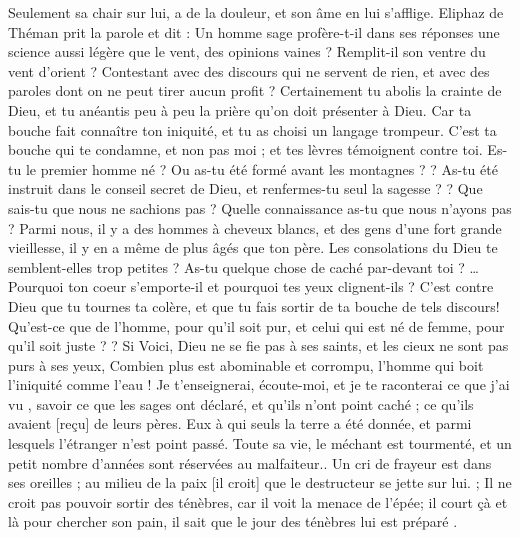 \begin{multicols}{2}
Seulement sa chair sur lui, a de la douleur, et son âme en lui s'afflige. 
\VerseOne{}Eliphaz de Théman prit la parole et dit :
Un homme sage profère-t-il dans ses réponses une science aussi légère que le vent, des opinions vaines ? Remplit-il son ventre du vent d'orient ?
Contestant avec des discours qui ne servent de rien, et avec des paroles dont on ne peut tirer aucun profit ?
Certainement tu abolis la crainte de Dieu, et tu anéantis peu à peu la prière qu'on doit présenter à Dieu. 
 Car ta bouche fait connaître ton iniquité, et tu as choisi un langage trompeur. 
C'est ta bouche qui te condamne, et non pas moi ; et tes lèvres témoignent contre toi. 
Es-tu le premier homme né ? Ou as-tu été formé avant les montagnes ?  ?
As-tu été instruit dans le conseil secret de Dieu, et renfermes-tu seul la sagesse ?  ?
Que sais-tu que nous ne sachions pas ? Quelle connaissance as-tu que nous n'ayons pas ?
Parmi nous, il y a des hommes à cheveux blancs, et des gens d'une fort grande vieillesse, il y en a même de plus âgés que ton père. 
Les consolations du Dieu te semblent-elles trop petites ? As-tu quelque chose de caché par-devant toi ? …
Pourquoi ton coeur s'emporte-il et pourquoi tes yeux clignent-ils ?
C'est contre Dieu que tu tournes ta colère, et que tu fais sortir de ta bouche de tels discours! 
Qu'est-ce que de l'homme, pour qu'il soit pur, et celui qui est né de femme, pour qu'il soit juste ?  ?
Si Voici, Dieu ne se fie pas à ses saints, et les cieux ne sont pas purs à ses yeux,
Combien plus est abominable et corrompu, l'homme qui boit l'iniquité comme l'eau !  
Je t'enseignerai, écoute-moi, et je te raconterai ce que j'ai vu ,
 savoir ce que les sages ont déclaré, et qu'ils n'ont point caché ; ce qu'ils avaient [reçu] de leurs pères.
Eux à qui seuls la terre a été donnée, et parmi lesquels l'étranger n'est point passé.
Toute sa vie, le méchant est tourmenté, et un petit nombre d'années sont réservées au malfaiteur..
Un cri de frayeur est dans ses oreilles ; au milieu de la paix [il croit] que le destructeur se jette sur lui.  ;
Il ne croit pas pouvoir sortir des ténèbres, car il voit la menace de   l’épée;
il court çà et là pour chercher son pain, il sait que le jour des ténèbres lui est préparé .

\end{multicols}
